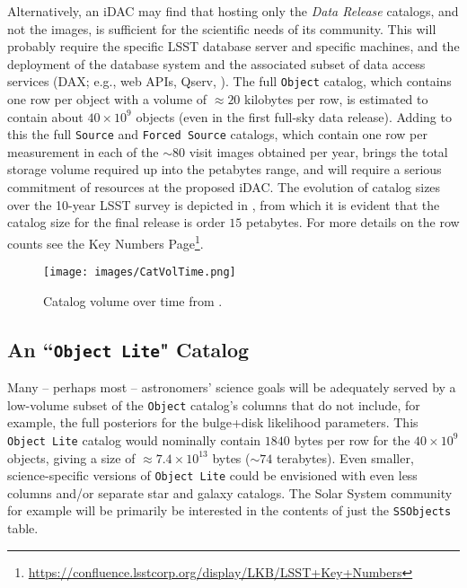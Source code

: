 Alternatively, an iDAC may find that hosting only the {\it Data Release} catalogs, and not the images, is sufficient for the scientific needs of its community. This will probably require the specific LSST database server  and specific machines, and the deployment of the database system and the associated subset of data access services (DAX; e.g., web APIs, Qserv, ). The full {\tt Object} catalog, which contains one row per object with a volume of $\approx 20$ kilobytes per row, is estimated to contain about $40 \times 10^9$ objects (even in the first full-sky data release). Adding to this the full {\tt Source} and {\tt Forced Source} catalogs, which contain one row per measurement in each of the $\sim80$ visit images obtained per year, brings the total storage volume required up into the petabytes range, and will require a serious commitment of resources at the proposed iDAC. The evolution of catalog sizes over the 10-year LSST survey is depicted in , from which it is evident that the catalog size for the final release is order $15$ petabytes. For more details on the row counts see the Key Numbers Page\footnote{\url{https://confluence.lsstcorp.org/display/LKB/LSST+Key+Numbers}}.

\begin{figure}
\begin{center}
\texttt{[image: images/CatVolTime.png]}
\caption{Catalog volume over time from . \label{fig:catvol}}
\end{center}
\end{figure}

\subsection{An ``{\tt Object Lite}" Catalog}\label{sec:lite}

Many -- perhaps most -- astronomers' science goals will be adequately served by a low-volume subset of the {\tt Object} catalog's columns that do not include, for example, the full posteriors for the bulge+disk likelihood parameters. 
This {\tt Object Lite} catalog would nominally contain $1840$ bytes per row for the $40 \times 10^{9}$ objects, giving a size of $\approx 7.4 \times 10^{13}$ bytes ($\sim74$ terabytes). 
Even smaller, science-specific versions of {\tt Object Lite} could be envisioned with even less columns and/or separate star and galaxy catalogs. 
The Solar System community for example will be primarily be interested in the contents of  just the  {\tt SSObjects} table.  

